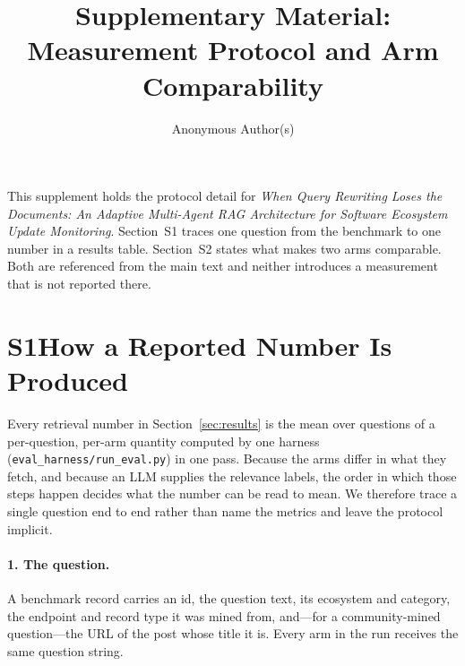 \documentclass[acmsmall,anonymous,screen]{acmart}
\begin{document}
\title{Supplementary Material: Measurement Protocol and Arm Comparability}
\author{Anonymous Author(s)}
\maketitle

\noindent This supplement holds the protocol detail for \emph{When Query
Rewriting Loses the Documents: An Adaptive Multi-Agent RAG Architecture for
Software Ecosystem Update Monitoring}. Section~S1 traces one question from the
benchmark to one number in a results table. Section~S2 states what makes two
arms comparable. Both are referenced from the main text and neither introduces
a measurement that is not reported there.

\section*{S1\quad How a Reported Number Is Produced}
Every retrieval number in Section~\ref{sec:results} is the mean over questions
of a per-question, per-arm quantity computed by one harness
(\texttt{eval\_harness/run\_eval.py}) in one pass. Because the arms differ in
what they fetch, and because an LLM supplies the relevance labels, the order in
which those steps happen decides what the number can be read to mean. We
therefore trace a single question end to end rather than name the metrics and
leave the protocol implicit.

\paragraph{1. The question.} A benchmark record carries an id, the question
text, its ecosystem and category, the endpoint and record type it was mined
from, and---for a community-mined question---the URL of the post whose title it
is. Every arm in the run receives the same question string.
\end{document}
